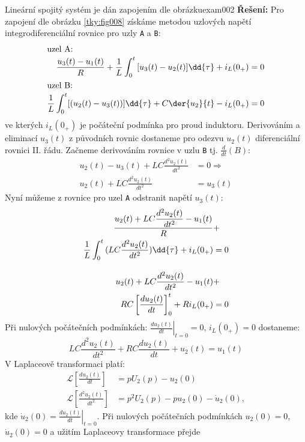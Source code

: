 \begin{tkyexam}{Lineární spojitý systém je dán zapojením dle obrázku}{exam002}
  \noindent\textbf{Řešení:} Pro zapojení dle obrázku \ref{tky:fig008} získáme metodou uzlových
  napětí integrodiferenciální rovnice pro uzly \texttt{A} a \texttt{B}:
  \begin{gather*}
    \begin{align*}
      \shortintertext{uzel A:}
      \frac{u_3(t)-u_1(t)}{R}+\frac{1}{L}\int_0^t{[u_3(t)-u_2(t)]}\dd{\tau}+i_L(0_+) &= 0  \\
      \shortintertext{uzel B:}
      \frac{1}{L}\int_0^t[(u_2(t)-u_3(t))]\dd{\tau}+C\der{u_2}{t}-i_L(0_+)           &= 0
    \end{align*}
  \end{gather*}
  ve kterých \(i_L(0_+)\) je počáteční podmínka pro proud induktoru. Derivováním a eliminací
  $u_3(t)$ z původních rovnic dostaneme pro odezvu $u_2(t)$ diferenciální rovnici II. řádu. Začneme
  derivováním rovnice v uzlu \texttt{B} tj. \(\frac{d}{dt}(B)\):
  \begin{align*}
    u_2(t)-u_3(t)+LC\frac{d^2u_2(t)}{dt^2} &=0 \Rightarrow   \\
    u_2(t)+LC\frac{d^2u_2(t)}{dt^2}        &=u_3(t)
  \end{align*}
  Nyní můžeme z rovnice pro uzel \texttt{A} odstranit napětí \(u_3(t)\):
  \begin{align*}
    \frac{u_2(t)+LC\dfrac{d^2u_2(t)}{dt^2}-u_1(t)}{R}             &+    \\
    \frac{1}{L}\int_0^t{(LC\frac{d^2u_2(t)}{dt^2})}\dd{\tau}+i_L(0_+) &=  0 \\
    \shortintertext{}
    u_2(t)+LC\frac{d^2u_2(t)}{dt^2}-u_1(t)                        &+    \\
    RC\left[\frac{du_2(t)}{dt}\right]_0^t+Ri_L(0_+)               &=  0
  \end{align*}
  Při nulových počátečních podmínkách: $\left.\frac{du_2(t)}{dt}\right\rvert_{t=0}=0$,
  $i_L(0_+)=0$ dostaneme:
  \begin{equation*}
    \boxed{LC\frac{d^2u_2(t)}{dt^2}+RC\frac{du_2(t)}{dt}+u_2(t)=u_1(t)}
  \end{equation*}
  V Laplaceově transformaci platí:
  \begin{align*}
    \mathcal{L}\left[\frac{du_2(t)}{dt}\right]     &= pU_2(p)-u_2(0) \\
    \mathcal{L}\left[\frac{d^2u_2(t)}{dt^2}\right] &= p^2U_2(p)-pu_2(0)-\dot{u}_2(0),
  \end{align*}
  kde \(\dot{u}_2(0)=\left.\frac{du_2(t)}{dt}\right\rvert_{t=0}\). Při nulových počátečních
  podmínkách \(u_2(0) = 0\), \(\dot{u}_2(0) = 0\) a užitím Laplaceovy transformace přejde

\end{tkyexam}
